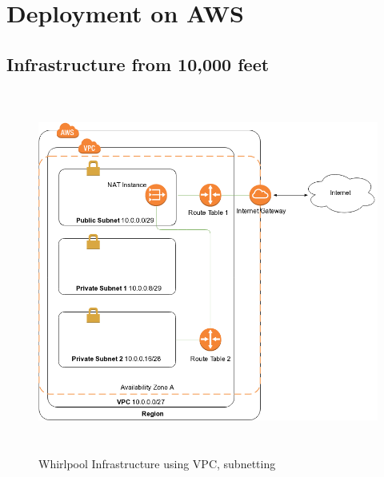 \chapter{Deployment on AWS}
\section{Infrastructure from 10,000 feet}
\begin{figure}[h!]
  \centering
  \includegraphics[width=20cm,height=12cm,keepaspectratio]{../media/crawler/ten-thousand-feet-aws.png}
  \caption{Whirlpool Infrastructure using VPC, subnetting}
\end{figure}

\pagebreak